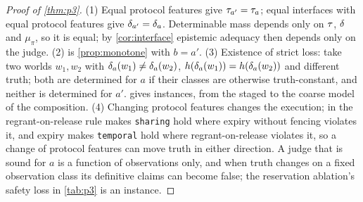 \begin{proof}[Proof of \cref{thm:p3}]
(1) Equal protocol features give $\tau_{a'} = \tau_a$; equal interfaces with equal protocol features give $\delta_{a'} = \delta_a$. Determinable mass depends only on $\tau$, $\delta$ and $\mu_\pi$, so it is equal; by \cref{cor:interface} epistemic adequacy then depends only on the judge. (2) is \cref{prop:monotone} with $b = a'$. (3) Existence of strict loss: take two worlds $w_1, w_2$ with $\delta_a(w_1) \neq \delta_a(w_2)$, $h(\delta_a(w_1)) = h(\delta_a(w_2))$ and different truth; both are determined for $a$ if their classes are otherwise truth-constant, and neither is determined for $a'$.  gives instances, from the staged to the coarse model of the composition. (4) Changing protocol features changes the execution; in  the regrant-on-release rule makes \texttt{sharing} hold where expiry without fencing violates it, and expiry makes \texttt{temporal} hold where regrant-on-release violates it, so a change of protocol features can move truth in either direction. A judge that is sound for $a$ is a function of observations only, and when truth changes on a fixed observation class its definitive claims can become false; the reservation ablation's safety loss in \cref{tab:p3} is an instance.
\end{proof}
